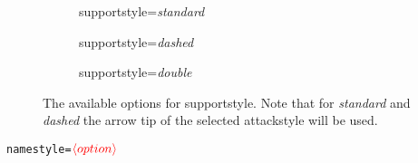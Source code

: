 \documentclass{article}
\newcommand{\opt}[2][red]{\ensuremath{\textcolor{#1}{\langle #2\rangle}}}
\begin{document}
\begin{figure}[!h]
    \begin{subfigure}{0.32\textwidth}
        \centering
        \begin{af}[supportstyle=standard]
    
        \end{af}
        \caption{\textsf{supportstyle}=\textit{standard}}
        \label{fig:supportstyle_standard}
    \end{subfigure}
    \hfill
    \begin{subfigure}{0.3\textwidth}
        \centering
        \begin{af}[supportstyle=dashed]
    
        \end{af}
        \caption{\textsf{supportstyle}=\textit{dashed}}
        \label{fig:supportstyle_dashed}
    \end{subfigure}
    \hfill
    \begin{subfigure}{0.3\textwidth}
        \centering
        \begin{af}[supportstyle=double]
    
        \end{af}
        \caption{\textsf{supportstyle}=\textit{double}}
        \label{fig:supportstyle_double}
    \end{subfigure}
    \caption{The available options for \textsf{supportstyle}. Note that for \textit{standard} and \textit{dashed} the arrow tip of the selected \textsf{attackstyle} will be used.}
    \label{fig:supportstyle}
\end{figure}

\newpage
\noindent\texttt{namestyle=}\opt{option}
    
\end{document}
